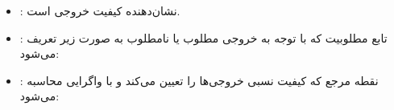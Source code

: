 \documentclass[11pt, a4paper, oneside]{book}
\begin{document}
					\begin{itemize}
						
						\item {\large {}}:
						نشان‌دهنده کیفیت خروجی  است.
					
						\item {\large {}}:‌
						تابع مطلوبیت که با توجه به خروجی مطلوب یا نامطلوب به صورت زیر تعریف می‌شود:
						\begin{center}
						\end{center}
						
						\item {\large {}}:
						نقطه مرجع که کیفیت نسبی خروجی‌ها را تعیین می‌کند و با واگرایی  محاسبه می‌شود:
						\begin{center}
						\end{center}
						
					\end{itemize}
\end{document}
